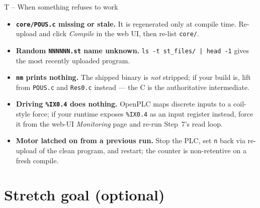 \documentclass[11pt,a4paper]{article}
\begin{document}
\begin{stepbox}{T -- When something refuses to work}
\begin{itemize}\setlength{\itemsep}{2pt}
  \item \textbf{\texttt{core/POUS.c} missing or stale.} It is regenerated
        only at compile time. Re-upload and click \emph{Compile} in the web
        UI, then re-list \texttt{core/}.
  \item \textbf{Random \texttt{NNNNNN.st} name unknown.}
        \texttt{ls -t st\_files/ | head -1} gives the most recently
        uploaded program.
  \item \textbf{\texttt{nm} prints nothing.} The shipped binary is
        \emph{not} stripped; if your build is, lift from \texttt{POUS.c}
        and \texttt{Res0.c} instead --- the C is the authoritative
        intermediate.
  \item \textbf{Driving \texttt{\%IX0.4} does nothing.} OpenPLC maps
        discrete inputs to a coil-style force; if your runtime exposes
        \texttt{\%IX0.4} as an input register instead, force it from the
        web-UI \emph{Monitoring} page and re-run Step~7's read loop.
  \item \textbf{Motor latched on from a previous run.} Stop the PLC, set
        \texttt{n} back via re-upload of the clean program, and restart;
        the counter is non-retentive on a fresh compile.
\end{itemize}
\end{stepbox}

\section*{Stretch goal (optional)}
\end{document}
